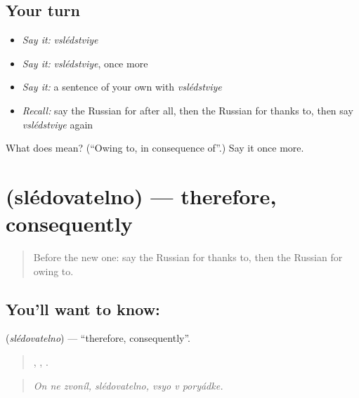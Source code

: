 \subsection*{Your turn}
\begin{itemize}
\raggedright
  \item \emph{Say it:} \emph{vslédstviye}
  \item \emph{Say it:} \emph{vslédstviye}, once more
  \item \emph{Say it:} a sentence of your own with \emph{vslédstviye}
  \item \emph{Recall:} say the Russian for after all, then the Russian for thanks to, then say \emph{vslédstviye} again
\end{itemize}

\begin{tcolorbox}[breakable,colback=teal!4,colframe=teal!35!black,title={Before you move on}]
What does  mean? (\textquotedblleft{}Owing to, in consequence of\textquotedblright{}.) Say it once more.
\end{tcolorbox}
\section[\texorpdfstring{\ru{следовательно} (slédovatelno)}{следовательно (slédovatelno)}]{ (slédovatelno) — therefore, consequently}

\label{lesson:RU-C351-sledovatelno}



\begin{quote}
Before the new one: say the Russian for thanks to, then the Russian for owing to.
\end{quote}

\subsection*{You'll want to know: }
\textbf{} (\emph{slédovatelno}) — \textquotedblleft{}therefore, consequently\textquotedblright{}.

\begin{quote}
  , ,   .
\end{quote}

\begin{quote}
\emph{On ne zvoníl, slédovatelno, vsyo v poryádke.}
\end{quote}

